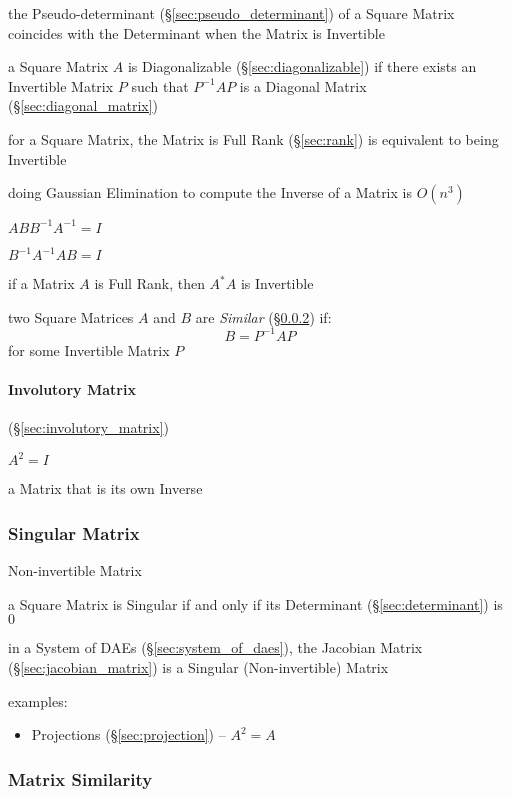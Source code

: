 the Pseudo-determinant (\S\ref{sec:pseudo_determinant}) of a Square Matrix
coincides with the Determinant when the Matrix is Invertible

a Square Matrix $A$ is Diagonalizable (\S\ref{sec:diagonalizable}) if there
exists an Invertible Matrix $P$ such that $P^{-1}AP$ is a Diagonal Matrix
(\S\ref{sec:diagonal_matrix})

for a Square Matrix, the Matrix is Full Rank (\S\ref{sec:rank}) is
equivalent to being Invertible

doing Gaussian Elimination to compute the Inverse of a Matrix is $O(n^3)$

$ABB^{-1}A^{-1} = I$

$B^{-1}A^{-1}AB = I$

if a Matrix $A$ is Full Rank, then $A^*A$ is Invertible

two Square Matrices $A$ and $B$ are \emph{Similar}
(\S\ref{sec:matrix_similarity}) if:
\[
  B = P^{-1}AP
\]
for some Invertible Matrix $P$



\paragraph{Involutory Matrix} (\S\ref{sec:involutory_matrix})\hfill

$A^2 = I$

a Matrix that is its own Inverse



\subsubsection{Singular Matrix}\label{sec:singular_matrix}

Non-invertible Matrix

a Square Matrix is Singular if and only if its Determinant
(\S\ref{sec:determinant}) is $0$

\fist in a System of DAEs (\S\ref{sec:system_of_daes}), the Jacobian Matrix
(\S\ref{sec:jacobian_matrix}) is a Singular (Non-invertible) Matrix

examples:
\begin{itemize}
  \item Projections (\S\ref{sec:projection}) -- $A^2 = A$
\end{itemize}



\subsubsection{Matrix Similarity}\label{sec:matrix_similarity}

